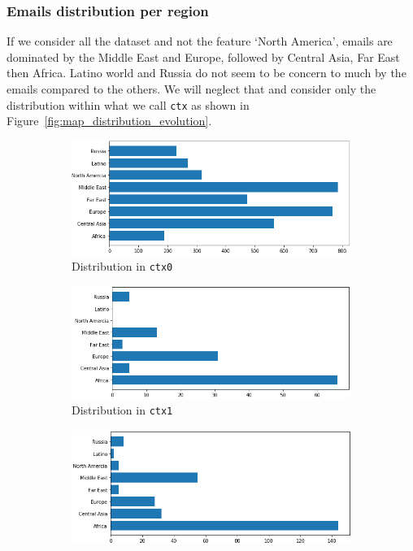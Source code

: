\documentclass[11pt]{article}
\begin{document}
\subsubsection{Emails distribution per region}

If we consider all the dataset and not the feature `North America', emails are dominated by the Middle East and Europe, followed by Central Asia, Far East then Africa. Latino world and Russia do not seem to be concern to much by the emails compared to the others. We will neglect that and consider only the distribution within what we call \texttt{ctx} as shown in Figure~\ref{fig:map_distribution_evolution}.

\begin{figure}[!t]
	\centering
	\begin{subfigure}[b]{0.3\linewidth}
		\centering
		\includegraphics[width=\linewidth]{images/emails_map_ctx0.png}
		\caption[]%
		{{\small Distribution in \texttt{ctx0}}}    
		\label{fig:emails_map_distribution_ctx0}
	\end{subfigure}
	\begin{subfigure}[b]{0.3\linewidth}
		\centering
		\includegraphics[width=\linewidth]{images/emails_map_ctx1.png}
		\caption[]%
		{{\small Distribution in \texttt{ctx1}}}
		\label{fig:emails_map_distribution_ctx1}
	\end{subfigure}
	\begin{subfigure}[b]{0.3\linewidth}
		\centering
		\includegraphics[width=\linewidth]{images/emails_map_ctx2.png}

\end{subfigure}
\end{figure}
\end{document}
